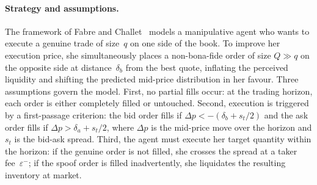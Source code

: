 \documentclass[11pt]{report}
\begin{document}
\paragraph{Strategy and assumptions.}
The framework of Fabre and Challet~\cite{fabre_2025} models a manipulative agent who wants to execute a genuine trade of size~$q$ on one side of the book. To improve her execution price, she simultaneously places a non-bona-fide order of size $Q \gg q$ on the opposite side at distance~$\delta_b$ from the best quote, inflating the perceived liquidity and shifting the predicted mid-price distribution in her favour. Three assumptions govern the model. First, no partial fills occur: at the trading horizon, each order is either completely filled or untouched. Second, execution is triggered by a first-passage criterion: the bid order fills if $\Delta p < -(\delta_b + s_t/2)$ and the ask order fills if $\Delta p > \delta_a + s_t/2$, where $\Delta p$ is the mid-price move over the horizon and $s_t$ is the bid-ask spread. Third, the agent must execute her target quantity within the horizon: if the genuine order is not filled, she crosses the spread at a taker fee~$\varepsilon^-$; if the spoof order is filled inadvertently, she liquidates the resulting inventory at market.
\end{document}
